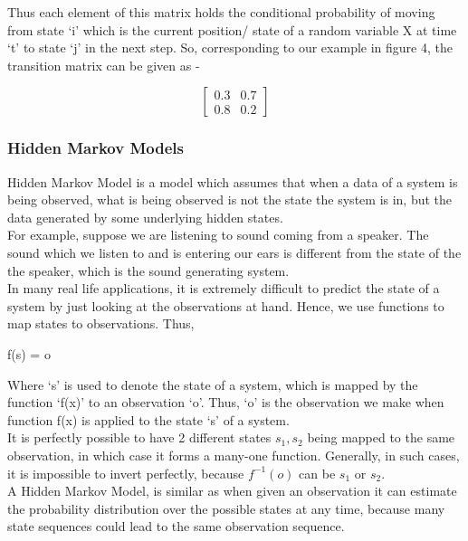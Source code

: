 \documentclass[10pt,twocolumn,letterpaper]{article}
\begin{document}
Thus each element of this matrix holds the conditional probability of moving from state ‘i’ which is the current position/ state of a random variable X at time ‘t’ to state ‘j’ in the next step. So, corresponding to our example in figure 4, the transition matrix can be given as -  

$$\begin{bmatrix}
0.3 & 0.7\\
0.8 & 0.2
\end{bmatrix}$$


\subsubsection{Hidden Markov Models}

Hidden Markov Model is a model which assumes that when a data of a system is being observed, what is being observed is not the state the system is in, but the data generated by some underlying hidden states. \\

For example, suppose we are listening to sound coming from a speaker. The sound which we listen to and is entering our ears is different from the state of the the speaker, which is the sound generating system. \\

In many real life applications, it is extremely difficult to predict the state of a system by just looking at the observations at hand. Hence, we use functions to map states to observations. Thus,
\begin{center}\begin{large}
    f(s) = o 
\end{large}
\end{center}
Where ‘s’ is used to denote the state of a system, which is mapped by the function ‘f(x)’ to an observation ‘o’. Thus, ‘o’ is the observation we make when function f(x) is applied to the state ‘s’ of a system.  \\

It is perfectly possible to have 2 different states $s_1, s_2$ being mapped to the same observation, in which case it forms a many-one function. Generally, in such cases, it is impossible to invert perfectly, because $f^{-1}(o)$ can be $s_1$ or $s_2$. \\

A Hidden Markov Model, is similar as when given an observation it can estimate the probability distribution over the possible states at any time, because many state sequences could lead to the same observation sequence. \\
\end{document}
